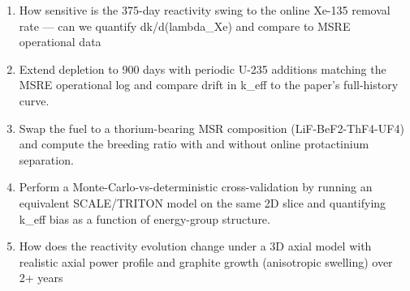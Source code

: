 \documentclass[11pt]{article}
\begin{document}
\begin{enumerate}[leftmargin=1.6em,itemsep=0.2em,topsep=0.2em,label=Q\arabic*.]
\item How sensitive is the 375-day reactivity swing to the online Xe-135 removal rate --- can we quantify dk/d(lambda\_Xe) and compare to MSRE operational data
\item Extend depletion to 900 days with periodic U-235 additions matching the MSRE operational log and compare drift in k\_eff to the paper's full-history curve.
\item Swap the fuel to a thorium-bearing MSR composition (LiF-BeF2-ThF4-UF4) and compute the breeding ratio with and without online protactinium separation.
\item Perform a Monte-Carlo-vs-deterministic cross-validation by running an equivalent SCALE/TRITON model on the same 2D slice and quantifying k\_eff bias as a function of energy-group structure.
\item How does the reactivity evolution change under a 3D axial model with realistic axial power profile and graphite growth (anisotropic swelling) over 2+ years
\end{enumerate}
\end{document}
